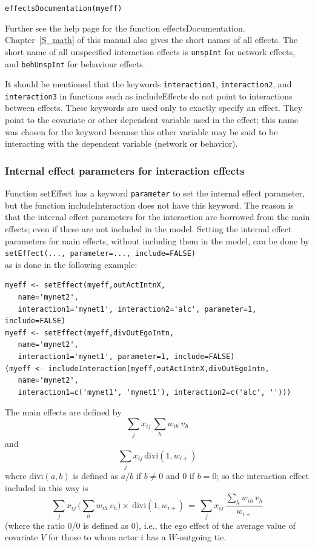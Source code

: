\documentclass[a4paper,fleqn,11pt]{article}
\newcommand{\+}{\, + \,}
\newcommand{\sfn}[1]{\textsf{#1}}
\begin{document}
\verb|effectsDocumentation(myeff)|

\noindent
Further see the help page for the function \sfn{effectsDocumentation}.
Chapter~\ref{S_math} of this manual also gives the short names of all effects.
The short name of all unspecified interaction effects is \texttt{unspInt}
for network effects, and \texttt{behUnspInt} for behaviour effects.

It should be mentioned that the keywords \texttt{interaction1},
\texttt{interaction2}, and \texttt{interaction3} in functions such as
\sfn{includeEffects} do not point to interactions between effects.
These keywords are used only to exactly specify an effect.
They point to the covariate or other dependent variable used in the effect;
this name was chosen for the keyword because this other variable may
be said to be interacting with the dependent variable (network or behavior).


\subsubsection{Internal effect parameters for interaction effects}
\label{intint}

Function \sfn{setEffect} has a keyword \texttt{parameter} to set the
internal effect parameter, but the function  \sfn{includeInteraction} does not
have this keyword. The reason is that the internal effect parameters for the
interaction are borrowed from the main effects; even if these are
not included in the model.
Setting the internal effect parameters for main effects, without including them
in the model, can be done by \\[0.2em]
\texttt{setEffect(..., parameter=..., include=FALSE)}\\[0.2em]
 as is done in the following example:
\begin{verbatim}
myeff <- setEffect(myeff,outActIntnX,
   name='mynet2',
   interaction1='mynet1', interaction2='alc', parameter=1, include=FALSE)
myeff <- setEffect(myeff,divOutEgoIntn,
   name='mynet2',
   interaction1='mynet1', parameter=1, include=FALSE)
(myeff <- includeInteraction(myeff,outActIntnX,divOutEgoIntn,
   name='mynet2',
   interaction1=c('mynet1', 'mynet1'), interaction2=c('alc', '')))
\end{verbatim}
The main effects are defined by
\[
\sum_j x_{ij}\, \sum_h w_{ih}\,v_h
\] and
\[
  \sum_j x_{ij}\, \text{divi}(1, w_{i+})
\]
where $\text{divi}(a,b)$ is defined as $a/b$ if $b \neq 0$ and 0 if $b=0$;
so the interaction effect included in this way is
\[
\sum_j x_{ij}\,  \Big( \sum_h w_{ih}\,v_h \Big) \times\ \text{divi}(1, w_{i+})
 \,=\,   \sum_j x_{ij}\, \frac{\sum_h w_{ih}\,v_h}{ w_{i+}}
\]
(where the ratio 0/0 is defined as 0), i.e., the ego effect of the
average value of covariate $V$
for those to whom actor $i$ has a $W$-outgoing tie.
\medskip
\end{document}
